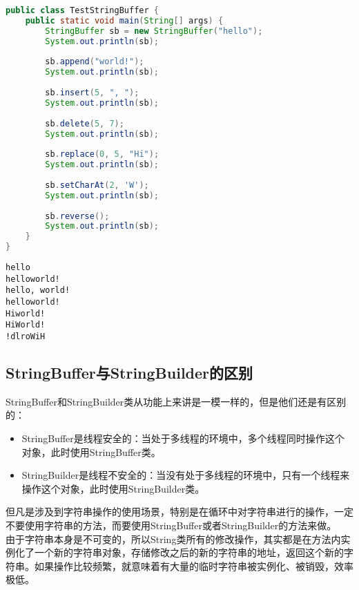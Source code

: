 
\begin{lstlisting}[language=Java]
public class TestStringBuffer {
    public static void main(String[] args) {
        StringBuffer sb = new StringBuffer("hello");
        System.out.println(sb);
        
        sb.append("world!");
        System.out.println(sb);
        
        sb.insert(5, ", ");
        System.out.println(sb);
        
        sb.delete(5, 7);
        System.out.println(sb);
        
        sb.replace(0, 5, "Hi");
        System.out.println(sb);
        
        sb.setCharAt(2, 'W');
        System.out.println(sb);
        
        sb.reverse();
        System.out.println(sb);
    }
}
\end{lstlisting}

\begin{tcolorbox}
	\begin{verbatim}
hello
helloworld!
hello, world!
helloworld!
Hiworld!
HiWorld!
!dlroWiH
	\end{verbatim}
\end{tcolorbox}

\subsection{StringBuffer与StringBuilder的区别}

StringBuffer和StringBuilder类从功能上来讲是一模一样的，但是他们还是有区别的：

\begin{itemize}
	\item StringBuffer是线程安全的：当处于多线程的环境中，多个线程同时操作这个对象，此时使用StringBuffer类。

	\item StringBuilder是线程不安全的：当没有处于多线程的环境中，只有一个线程来操作这个对象，此时使用StringBuilder类。
\end{itemize}

但凡是涉及到字符串操作的使用场景，特别是在循环中对字符串进行的操作，一定不要使用字符串的方法，而要使用StringBuffer或者StringBuilder的方法来做。 \\

由于字符串本身是不可变的，所以String类所有的修改操作，其实都是在方法内实例化了一个新的字符串对象，存储修改之后的新的字符串的地址，返回这个新的字符串。如果操作比较频繁，就意味着有大量的临时字符串被实例化、被销毁，效率极低。 \\

